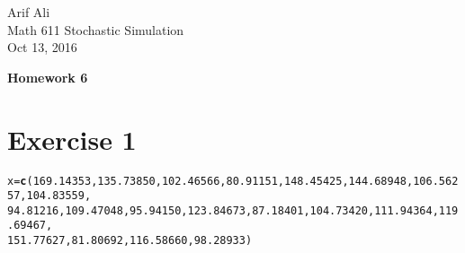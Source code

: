 \documentclass{article}\usepackage[]{graphicx}\usepackage[]{color}
\makeatletter
\newcommand{\hlnum}[1]{\textcolor[rgb]{0.686,0.059,0.569}{#1}}%
\newcommand{\hlstd}[1]{\textcolor[rgb]{0.345,0.345,0.345}{#1}}%
\newcommand{\hlkwb}[1]{\textcolor[rgb]{0.69,0.353,0.396}{#1}}%
\newcommand{\hlkwd}[1]{\textcolor[rgb]{0.737,0.353,0.396}{\textbf{#1}}}%
\newenvironment{kframe}{%
 \def\at@end@of@kframe{}%
 \ifinner\ifhmode%
  \def\at@end@of@kframe{\end{minipage}}%
  \begin{minipage}{\columnwidth}%
 \fi\fi%
 \def\FrameCommand##1{\hskip\@totalleftmargin \hskip-\fboxsep
 \colorbox{shadecolor}{##1}\hskip-\fboxsep
     \hskip-\linewidth \hskip-\@totalleftmargin \hskip\columnwidth}%
 \MakeFramed {\advance\hsize-\width
   \@totalleftmargin\z@ \linewidth\hsize
   \@setminipage}}%
 {\par\unskip\endMakeFramed%
 \at@end@of@kframe}
\newenvironment{knitrout}{}{} %
\makeatother
\begin{document}
\begin{flushright}
Arif Ali\\
Math 611 Stochastic Simulation\\
Oct 13, 2016\\
\end{flushright}

\begin{center}
\LARGE\textbf{Homework 6}
  \end{center}
\section*{Exercise 1}
\begin{knitrout}
\color{fgcolor}\begin{kframe}
\begin{alltt}
\hlstd{x} \hlkwb{=} \hlkwd{c}\hlstd{(}\hlnum{169.14353}\hlstd{,} \hlnum{135.73850}\hlstd{,} \hlnum{102.46566}\hlstd{,}  \hlnum{80.91151}\hlstd{,} \hlnum{148.45425}\hlstd{,} \hlnum{144.68948}\hlstd{,} \hlnum{106.56257}\hlstd{,} \hlnum{104.83559}\hlstd{,}
\hlnum{94.81216}\hlstd{,} \hlnum{109.47048}\hlstd{,}  \hlnum{95.94150}\hlstd{,} \hlnum{123.84673}\hlstd{,}  \hlnum{87.18401}\hlstd{,} \hlnum{104.73420}\hlstd{,} \hlnum{111.94364}\hlstd{,} \hlnum{119.69467}\hlstd{,}
\hlnum{151.77627}\hlstd{,}  \hlnum{81.80692}\hlstd{,} \hlnum{116.58660}\hlstd{,}  \hlnum{98.28933}\hlstd{)}


\end{alltt}
\end{kframe}
\end{knitrout}
\end{document}
